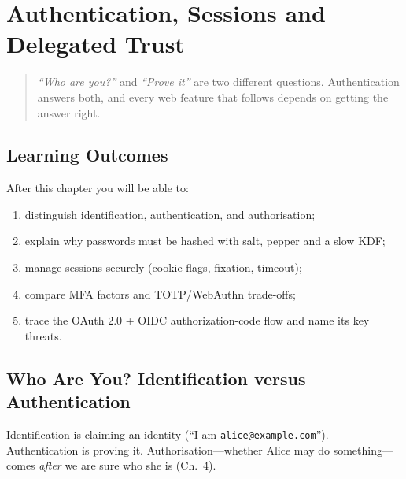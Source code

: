 \chapter{Authentication, Sessions and Delegated Trust}\label{ch:auth}

\begin{quote}
\emph{``Who are you?''} and \emph{``Prove it''} are two different questions. Authentication answers both, and every web feature that follows depends on getting the answer right.
\end{quote}

\noindent{}
\vspace{0.4em}

\section*{Learning Outcomes}
After this chapter you will be able to:
\begin{enumerate}[label=(L\arabic*)]
    \item distinguish identification, authentication, and authorisation;
    \item explain why passwords must be hashed with salt, pepper and a slow KDF;
    \item manage sessions securely (cookie flags, fixation, timeout);
    \item compare MFA factors and TOTP/WebAuthn trade-offs;
    \item trace the OAuth 2.0 + OIDC authorization-code flow and name its key threats.
\end{enumerate}

\section{Who Are You? Identification versus Authentication}\label{sec:auth-basics}
Identification is claiming an identity (``I am \texttt{alice@example.com}''). Authentication is proving it. Authorisation---whether Alice may do something---comes \emph{after} we are sure who she is (Ch.~4).

